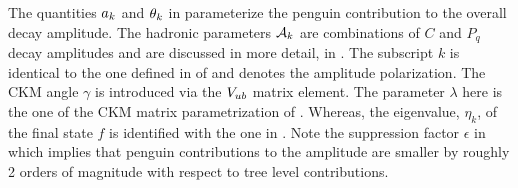 \noindent The quantities $a_k$ and $\theta_k$ in  parameterize the penguin
contribution to the overall \BsJpsiPhi decay amplitude. The hadronic parameters $\mathcal{A}_{k}$ are combinations
of $C$ and $P_q$ decay amplitudes and are discussed in more detail, in .
The subscript $k$ is identical to the one defined in  of 
and denotes the \BsJpsiPhi amplitude polarization. The CKM angle $\gamma$ is introduced via the $V_{ub}$ matrix element.
The parameter $\lambda$ here is the one of the CKM matrix parametrization of .
Whereas, the eigenvalue, $\eta_k$, of the final state $f$ is identified with the one in .
Note the suppression factor $\epsilon$ in  which implies that penguin contributions
to the \BsJpsiPhi amplitude are smaller by roughly 2 orders of magnitude with respect to tree level contributions.
